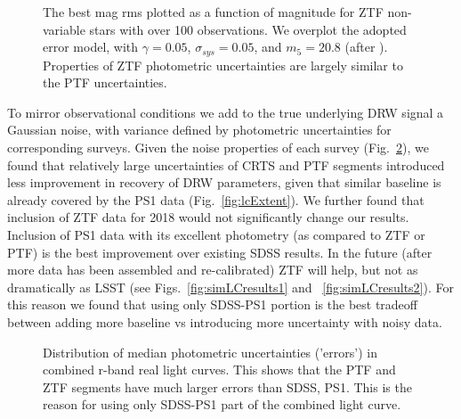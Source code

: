 \documentclass[twocolumn]{aastex62}
\begin{document}
\begin{figure}%
\caption{The best mag rms plotted as a function of magnitude for ZTF non-variable stars with over 100 observations. We overplot the adopted error model, with $\gamma = 0.05$, $\sigma_{sys} = 0.05 $, and $m_{5} = 20.8$ (after \citealt{ivezic2019}). Properties of ZTF photometric uncertainties are largely similar to the PTF uncertainties.}
\label{fig:ztf_errors}
\end{figure} 


To mirror observational conditions we add to the true underlying DRW signal a Gaussian noise, with variance defined by photometric uncertainties for corresponding surveys. Given the noise properties of each survey (Fig.~\ref{fig:combinedLCerrors}), we found that relatively large uncertainties of CRTS and PTF segments introduced less improvement in recovery of DRW parameters, given that similar baseline is already covered by the PS1 data (Fig.~\ref{fig:lcExtent}).  We further found that inclusion of ZTF data for 2018 would not significantly change our results. Inclusion of PS1 data with its excellent photometry (as compared to ZTF or PTF) is the best improvement over existing SDSS results.  In the future (after more data has been assembled and re-calibrated) ZTF will help, but not as dramatically as LSST (see Figs.~\ref{fig:simLCresults1} and ~\ref{fig:simLCresults2}).  For this reason we found that using only SDSS-PS1 portion is the best tradeoff between adding more baseline vs introducing more uncertainty with noisy data.

\begin{figure}%
\caption{Distribution of median photometric uncertainties ('errors') in combined r-band real light curves. This shows that the PTF and ZTF segments have much larger errors than SDSS, PS1. This is the reason for using only SDSS-PS1 part of the combined light curve.}
\label{fig:combinedLCerrors}
\end{figure} 

\end{document}
